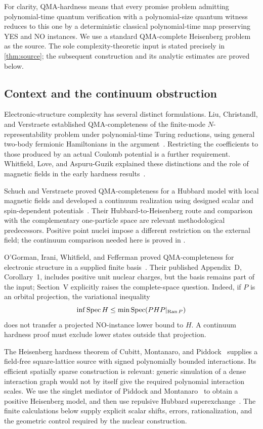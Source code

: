 For clarity, QMA-hardness means that every promise problem admitting polynomial-time quantum verification with a polynomial-size quantum witness reduces to this one by a deterministic classical polynomial-time map preserving YES and NO instances. We use a standard QMA-complete Heisenberg problem as the source. The sole complexity-theoretic input is stated precisely in \cref{thm:source}; the subsequent construction and its analytic estimates are proved below.

\subsection{Context and the continuum obstruction}

Electronic-structure complexity has several distinct formulations.
Liu, Christandl, and Verstraete established QMA-completeness of the
finite-mode $N$-representability problem under polynomial-time Turing
reductions, using general two-body fermionic Hamiltonians in the
argument~\cite{LiuChristandlVerstraete2007}. Restricting
the coefficients to those produced by an actual Coulomb potential is a
further requirement. Whitfield, Love, and Aspuru-Guzik explained these
distinctions and the role of magnetic fields in the early hardness
results~\cite[Sections~3.1 and~6.1]{WhitfieldLoveAspuruGuzik2013}.

Schuch and Verstraete proved QMA-completeness for a Hubbard model with
local magnetic fields and developed a continuum realization using designed
scalar and spin-dependent potentials~\cite{SchuchVerstraete2009}. Their
Hubbard-to-Heisenberg route and comparison with the complementary
one-particle space are relevant methodological predecessors. Positive
point nuclei impose a different restriction on the external field; the
continuum comparison needed here is proved in .

O'Gorman, Irani, Whitfield, and Fefferman proved QMA-completeness for electronic structure in a supplied finite basis~\cite[Theorem~1]{OGorman2022}. Their published Appendix~D, Corollary~1, includes positive unit nuclear charges, but the basis remains part of the input; Section~V explicitly raises the complete-space question. Indeed, if $P$ is an orbital projection, the variational inequality
\[
\inf\operatorname{Spec} H\le\min\operatorname{Spec}(PHP|_{\operatorname{Ran}P})
\]
does not transfer a projected NO-instance lower bound to $H$. A continuum hardness proof must exclude lower states outside that projection.

The Heisenberg hardness theorem of Cubitt, Montanaro, and Piddock~\cite{CMP2018,CMP2019} supplies a field-free square-lattice source with signed polynomially bounded interactions. Its efficient spatially sparse construction is relevant: generic simulation of a dense interaction graph would not by itself give the required polynomial interaction scales. We use the singlet mediator of Piddock and Montanaro~\cite{PiddockMontanaro2017} to obtain a positive Heisenberg model, and then use repulsive Hubbard superexchange~\cite{Anderson1959}. The finite calculations below supply explicit scalar shifts, errors, rationalization, and the geometric control required by the nuclear construction.

